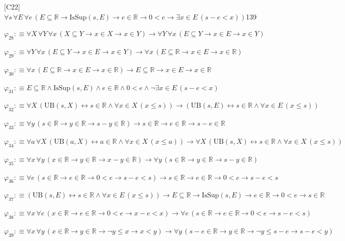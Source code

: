 \begin{fullproof}{[C22]}{$\forall s\,\forall E\,\forall e\,(E \subseteq \mathbb{R} \to \mathrm{IsSup}(s,E) \to e \in \mathbb{R} \to 0 < e \to \exists x \in E\,(s - e < x))$}{139}
\begin{abbrevlist}
\item $\varphi_{28} :\equiv \forall X\,\forall Y\,\forall x\,(X \subseteq Y \to x \in X \to x \in Y) \to \forall Y\,\forall x\,(E \subseteq Y \to x \in E \to x \in Y)$
\item $\varphi_{29} :\equiv \forall Y\,\forall x\,(E \subseteq Y \to x \in E \to x \in Y) \to \forall x\,(E \subseteq \mathbb{R} \to x \in E \to x \in \mathbb{R})$
\item $\varphi_{30} :\equiv \forall x\,(E \subseteq \mathbb{R} \to x \in E \to x \in \mathbb{R}) \to E \subseteq \mathbb{R} \to x \in E \to x \in \mathbb{R}$
\item $\varphi_{31} :\equiv E \subseteq \mathbb{R} \land \mathrm{IsSup}(s,E) \land e \in \mathbb{R} \land 0 < e \land \neg \exists x \in E\,(s - e < x)$
\item $\varphi_{32} :\equiv \forall X\,(\mathrm{UB}(s,X) \leftrightarrow s \in \mathbb{R} \land \forall x \in X\,(x \leq s)) \to (\mathrm{UB}(s,E) \leftrightarrow s \in \mathbb{R} \land \forall x \in E\,(x \leq s))$
\item $\varphi_{33} :\equiv \forall y\,(s \in \mathbb{R} \to y \in \mathbb{R} \to s - y \in \mathbb{R}) \to s \in \mathbb{R} \to e \in \mathbb{R} \to s - e \in \mathbb{R}$
\item $\varphi_{34} :\equiv \forall a\,\forall X\,(\mathrm{UB}(a,X) \leftrightarrow a \in \mathbb{R} \land \forall x \in X\,(x \leq a)) \to \forall X\,(\mathrm{UB}(s,X) \leftrightarrow s \in \mathbb{R} \land \forall x \in X\,(x \leq s))$
\item $\varphi_{35} :\equiv \forall x\,\forall y\,(x \in \mathbb{R} \to y \in \mathbb{R} \to x - y \in \mathbb{R}) \to \forall y\,(s \in \mathbb{R} \to y \in \mathbb{R} \to s - y \in \mathbb{R})$
\item $\varphi_{36} :\equiv \forall e\,(s \in \mathbb{R} \to e \in \mathbb{R} \to 0 < e \to s - e < s) \to s \in \mathbb{R} \to e \in \mathbb{R} \to 0 < e \to s - e < s$
\item $\varphi_{37} :\equiv (\mathrm{UB}(s,E) \leftrightarrow s \in \mathbb{R} \land \forall x \in E\,(x \leq s)) \to E \subseteq \mathbb{R} \to \mathrm{IsSup}(s,E) \to e \in \mathbb{R} \to 0 < e \to s \in \mathbb{R}$
\item $\varphi_{38} :\equiv \forall x\,\forall e\,(x \in \mathbb{R} \to e \in \mathbb{R} \to 0 < e \to x - e < x) \to \forall e\,(s \in \mathbb{R} \to e \in \mathbb{R} \to 0 < e \to s - e < s)$
\item $\varphi_{39} :\equiv \forall x\,\forall y\,(x \in \mathbb{R} \to y \in \mathbb{R} \to \neg y \leq x \to x < y) \to \forall y\,(s - e \in \mathbb{R} \to y \in \mathbb{R} \to \neg y \leq s - e \to s - e < y)$

\end{abbrevlist}
\end{fullproof}
